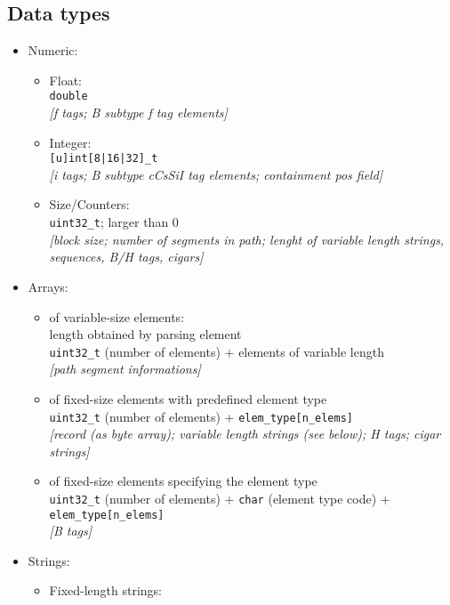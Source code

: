 \documentclass[12pt]{article}
\begin{document}
\subsection*{Data types}
\begin{itemize}
\item Numeric:
\begin{itemize}
   \item Float:\\
   \texttt{double}\\
   \textit{[f tags; B subtype f tag elements]}
   \item Integer:\\
   \texttt{[u]int[8|16|32]\_t}\\
   \textit{[i tags; B subtype cCsSiI tag elements; containment pos field]}
   \item Size/Counters:\\
   \texttt{uint32\_t}; larger than 0\\
   \textit{[block size; number of segments in path; lenght of variable length
       strings, sequences, B/H tags, cigars]}
\end{itemize}
\item Arrays:
\begin{itemize}
    \item of variable-size elements:\\
    length obtained by parsing element\\
    \texttt{uint32\_t} (number of elements) + elements of variable length\\
    \textit{[path segment informations]}
    \item of fixed-size elements with predefined element type\\
    \texttt{uint32\_t} (number of elements) + \texttt{elem\_type[n\_elems]}\\
    \textit{[record (as byte array);
    variable length strings (see below); H tags; cigar strings]}
    \item of fixed-size elements specifying the element type\\
    \texttt{uint32\_t} (number of elements) +
    \texttt{char} (element type code) +
    \texttt{elem\_type[n\_elems]}\\
    \textit{[B tags]}
\end{itemize}
\item Strings:
\begin{itemize}
  \item Fixed-length strings:\\

\end{itemize}
\end{itemize}
\end{document}
